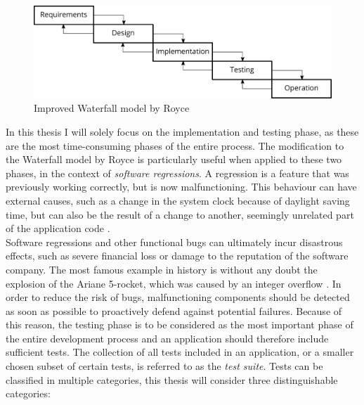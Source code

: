 \begin{figure}[htbp!]
	\centering
	\includegraphics[width=\textwidth]{assets/images/sdlc.pdf}
	\caption{Improved Waterfall model by Royce}
	\label{fig:waterfall-royce}
\end{figure}

\noindent In this thesis I will solely focus on the implementation and testing phase, as these are the most time-consuming phases of the entire process. The modification to the Waterfall model by Royce is particularly useful when applied to these two phases, in the context of \emph{software regressions}. A regression \cite{10.1007/978-3-540-77966-7_18} is a feature that was previously working correctly, but is now malfunctioning. This behaviour can have external causes, such as a change in the system clock because of daylight saving time, but can also be the result of a change to another, seemingly unrelated part of the application code \cite{6588537}.\\

\noindent Software regressions and other functional bugs can ultimately incur disastrous effects, such as severe financial loss or damage to the reputation of the software company. The most famous example in history is without any doubt the explosion of the Ariane 5-rocket, which was caused by an integer overflow \cite{581900}. In order to reduce the risk of bugs, malfunctioning components should be detected as soon as possible to proactively defend against potential failures. Because of this reason, the testing phase is to be considered as the most important phase of the entire development process and an application should therefore include sufficient tests. The collection of all tests included in an application, or a smaller chosen subset of certain tests, is referred to as the \emph{test suite}. Tests can be classified in multiple categories, this thesis will consider three distinguishable categories:


